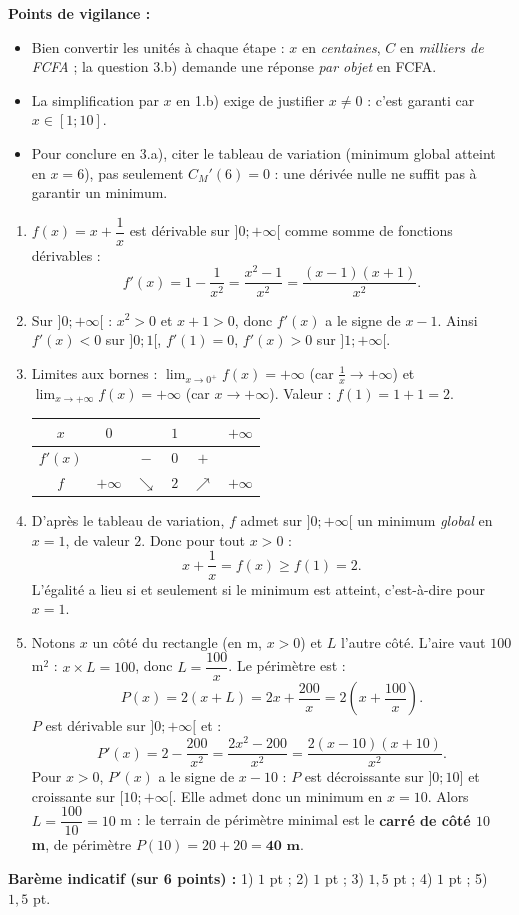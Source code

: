 \documentclass[11pt]{article}
\begin{document}
\begin{corrige}
\textbf{Points de vigilance :}
\begin{itemize}
\item Bien convertir les unités à chaque étape : $x$ en \emph{centaines}, $C$ en \emph{milliers de FCFA} ; la question 3.b) demande une réponse \emph{par objet} en FCFA.
\item La simplification par $x$ en 1.b) exige de justifier $x\neq 0$ : c'est garanti car $x\in[1;10]$.
\item Pour conclure en 3.a), citer le tableau de variation (minimum global atteint en $x=6$), pas seulement $C_M'(6)=0$ : une dérivée nulle ne suffit pas à garantir un minimum.
\end{itemize}
\end{corrige}

\begin{corrige}
\begin{enumerate}
\item $f(x)=x+\dfrac{1}{x}$ est dérivable sur $]0;+\infty[$ comme somme de fonctions dérivables :
\[ f'(x)=1-\frac{1}{x^2}=\frac{x^2-1}{x^2}=\frac{(x-1)(x+1)}{x^2}. \]
\item Sur $]0;+\infty[$ : $x^2>0$ et $x+1>0$, donc $f'(x)$ a le signe de $x-1$.
Ainsi $f'(x)<0$ sur $]0;1[$, $f'(1)=0$, $f'(x)>0$ sur $]1;+\infty[$.
\item Limites aux bornes : $\lim_{x\to 0^+}f(x)=+\infty$ (car $\frac{1}{x}\to+\infty$) et $\lim_{x\to+\infty}f(x)=+\infty$ (car $x\to+\infty$). Valeur : $f(1)=1+1=2$.
\begin{center}
\begin{tabular}{|c|ccccc|}
\hline
$x$ & $0$ & & $1$ & & $+\infty$ \\
\hline
$f'(x)$ & & $-$ & $0$ & $+$ & \\
\hline
$f$ & $+\infty$ & $\searrow$ & $2$ & $\nearrow$ & $+\infty$ \\
\hline
\end{tabular}
\end{center}
\item D'après le tableau de variation, $f$ admet sur $]0;+\infty[$ un minimum \emph{global} en $x=1$, de valeur $2$. Donc pour tout $x>0$ :
\[ x+\frac{1}{x}=f(x)\geq f(1)=2. \]
L'égalité a lieu si et seulement si le minimum est atteint, c'est-à-dire pour $x=1$.
\item Notons $x$ un côté du rectangle (en m, $x>0$) et $L$ l'autre côté. L'aire vaut $100$ m$^2$ : $x\times L=100$, donc $L=\dfrac{100}{x}$. Le périmètre est :
\[ P(x)=2(x+L)=2x+\frac{200}{x}=2\left(x+\frac{100}{x}\right). \]
$P$ est dérivable sur $]0;+\infty[$ et :
\[ P'(x)=2-\frac{200}{x^2}=\frac{2x^2-200}{x^2}=\frac{2(x-10)(x+10)}{x^2}. \]
Pour $x>0$, $P'(x)$ a le signe de $x-10$ : $P$ est décroissante sur $]0;10]$ et croissante sur $[10;+\infty[$. Elle admet donc un minimum en $x=10$.
Alors $L=\dfrac{100}{10}=10$ m : le terrain de périmètre minimal est le \textbf{carré de côté $10$ m}, de périmètre $P(10)=20+20=\textbf{40 m}$.
\end{enumerate}
\textbf{Barème indicatif (sur 6 points) :} 1) $1$ pt ; 2) $1$ pt ; 3) $1,5$ pt ; 4) $1$ pt ; 5) $1,5$ pt.


\end{corrige}
\end{document}
